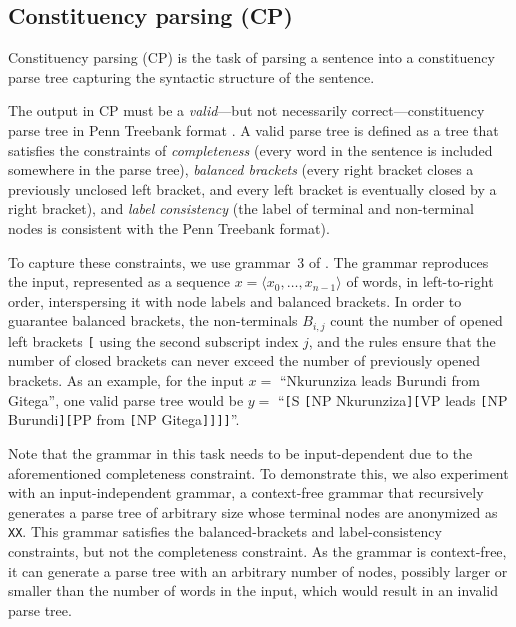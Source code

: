 % 

\subsection{Constituency parsing (CP)}

Constituency parsing (CP) is the task of parsing a sentence into a constituency parse tree capturing the syntactic structure of the sentence.

The output in CP must be a \textit{valid}---but not necessarily correct---constituency parse tree in Penn Treebank format \cite{evalb}.
A valid parse tree is defined as a tree that satisfies the constraints of
\textit{completeness} (every word in the sentence is included somewhere in the parse tree),
\textit{balanced brackets}
(every right bracket closes a previously unclosed left bracket, and every left bracket is eventually closed by a right bracket),
and
\textit{label consistency} (the label of terminal and non-terminal nodes is consistent with the Penn Treebank format).

To capture these constraints, we use grammar~3 of .
%
The grammar reproduces the input, represented as a sequence $x=\langle x_0, \dots, x_{n-1}\rangle$ of words, in left-to-right order, interspersing it with node labels and balanced brackets. In order to guarantee balanced brackets, the non-terminals $B_{i,j}$ count the number of opened left brackets \texttt{[} using the second subscript index $j$, and the rules ensure that the number of closed brackets can never exceed the number of previously opened brackets.
As an example, for the input $x=$ ``Nkurunziza leads Burundi from Gitega'', one valid parse tree would be $y=$ ``\texttt{[}S \texttt{[}NP Nkurunziza\texttt{]}\texttt{[}VP leads \texttt{[}NP Burundi\texttt{]}\texttt{[}PP from \texttt{[}NP Gitega\texttt{]}\texttt{]}\texttt{]}\texttt{]}''.

Note that the grammar in this task needs to be input-dependent
due to the aforementioned completeness constraint.
To demonstrate this, we also experiment with an input-independent grammar, a context-free grammar that recursively generates a parse tree of arbitrary size whose terminal nodes are anonymized as \texttt{XX}.
%
This grammar satisfies the balanced\hyp brackets and label\hyp consistency constraints, but not the completeness constraint.
As the grammar is context-free, it can generate a parse tree with an arbitrary number of nodes, possibly larger or smaller than the number of words in the input, which would result in an invalid parse tree.


